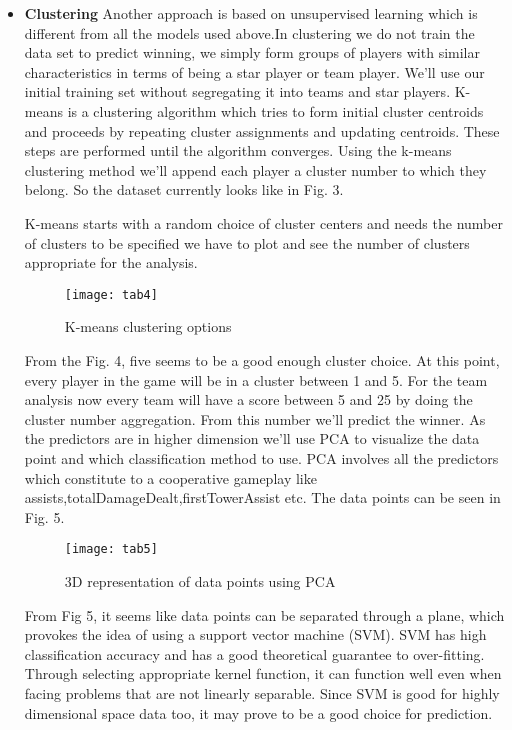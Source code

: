 \documentclass[conference]{IEEEtran}
\begin{document}
\begin{itemize}
  \item \textbf{Clustering}
Another approach is based on unsupervised learning which is different from all the models used above.In clustering we do not train the data set to predict winning, we simply form groups of players with similar characteristics in terms of being a star player or team player. We’ll use our initial training set without segregating it into teams and star players. K-means is a clustering algorithm which tries to form initial cluster centroids and proceeds by repeating cluster assignments and updating centroids. These steps are performed until the algorithm converges. Using the k-means clustering method we’ll append each player a cluster number to which they belong. 
So the dataset currently looks like in Fig. 3.


 K-means starts with a random choice of cluster centers and needs the number of clusters to be specified we have to plot and see the number of clusters appropriate for the analysis.

\begin{figure}[!t]
\texttt{[image: tab4]}
\caption{K-means clustering options}
\end{figure}

 From the Fig. 4, five seems to be a good enough cluster choice. At this point, every player in the game will be in a cluster between 1 and 5. For the team analysis now every team will have a score between 5 and 25 by doing the cluster number aggregation. From this number we’ll predict the winner. As the predictors are in higher dimension we’ll use PCA to visualize the data point and which classification method to use. PCA involves all the predictors which constitute to a cooperative gameplay like assists,totalDamageDealt,firstTowerAssist etc. The data points can be seen in Fig. 5.

\begin{figure}[!t]
\texttt{[image: tab5]}
\caption{3D representation of data points using PCA}
\end{figure}

 From Fig 5, it seems like data points can be separated through a plane, which provokes the idea of using a support vector machine (SVM). SVM has high classification accuracy and has a good theoretical guarantee to over-fitting. Through selecting appropriate kernel function, it can function well even when facing problems that are not linearly separable. Since SVM is good for highly dimensional space data too, it may prove to be a good choice for prediction.

\end{itemize}
\end{document}
